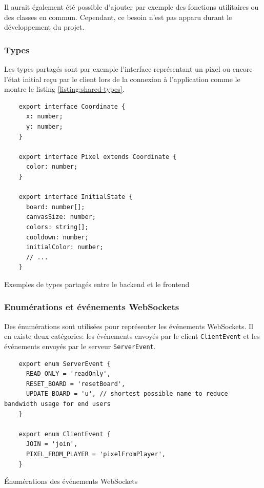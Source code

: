 Il aurait également été possible d'ajouter par exemple des fonctions utilitaires ou des classes en commun. Cependant, ce besoin n'est pas apparu durant le développement du projet.

\subsubsection{Types}

Les types partagés sont par exemple l'interface représentant un pixel ou encore l'état initial reçu par le client lors de la connexion à l'application comme le montre le listing \ref{listing:shared-types}.

\begin{listing}[H]
  \begin{verbatim}
    export interface Coordinate {
      x: number;
      y: number;
    }

    export interface Pixel extends Coordinate {
      color: number;
    }

    export interface InitialState {
      board: number[];
      canvasSize: number;
      colors: string[];
      cooldown: number;
      initialColor: number;
      // ...
    }
\end{verbatim}
  \caption{Exemples de types partagés entre le backend et le frontend}
  \label{listing:shared-types}
\end{listing}

\subsubsection{Enumérations et événements WebSockets}

Des énumérations sont utilisées pour représenter les événements WebSockets. Il en existe deux catégories: les événements envoyés par le client \texttt{ClientEvent} et les événements envoyés par le serveur \texttt{ServerEvent}.

\begin{listing}[H]
  \begin{verbatim}
    export enum ServerEvent {
      READ_ONLY = 'readOnly',
      RESET_BOARD = 'resetBoard',
      UPDATE_BOARD = 'u', // shortest possible name to reduce bandwidth usage for end users
    }

    export enum ClientEvent {
      JOIN = 'join',
      PIXEL_FROM_PLAYER = 'pixelFromPlayer',
    }
\end{verbatim}
  \caption{Énumérations des événements WebSockets}
  \label{listing:websocket-events-enums}
\end{listing}

